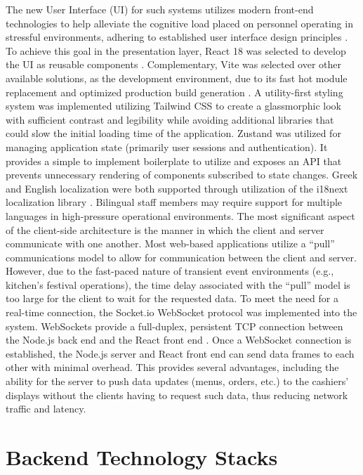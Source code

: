 The new User Interface (UI) for such systems utilizes modern front-end technologies to help alleviate the cognitive load placed on personnel operating in stressful environments, adhering to established user interface design principles \cite{galitz2007}. To achieve this goal in the presentation layer, React 18 was selected to develop the UI as reusable components \cite{react2024docs}. Complementary, Vite was selected over other available solutions, as the development environment, due to its fast hot module replacement and optimized production build generation \cite{vite2024docs}. A utility-first styling system was implemented utilizing Tailwind CSS \cite{tailwind} to create a glassmorphic look with sufficient contrast and legibility while avoiding additional libraries that could slow the initial loading time of the application. Zustand \cite{zustand} was utilized for managing application state (primarily user sessions and authentication). It provides a simple to implement boilerplate to utilize and exposes an API that prevents unnecessary rendering of components subscribed to state changes. Greek and English localization were both supported through utilization of the i18next localization library \cite{i18next2024}. Bilingual staff members may require support for multiple languages in high-pressure operational environments. The most significant aspect of the client-side architecture is the manner in which the client and server communicate with one another. Most web-based applications utilize a ``pull'' communications model to allow for communication between the client and server. However, due to the fast-paced nature of transient event environments (e.g., kitchen's festival operations), the time delay associated with the ``pull'' model is too large for the client to wait for the requested data. To meet the need for a real-time connection, the Socket.io WebSocket protocol was implemented into the system. WebSockets provide a full-duplex, persistent TCP connection between the Node.js back end and the React front end \cite{fette2011websocket}. Once a WebSocket connection is established, the Node.js server and React front end can send data frames to each other with minimal overhead. This provides several advantages, including the ability for the server to push data updates (menus, orders, etc.) to the cashiers' displays without the clients having to request such data, thus reducing network traffic and latency.

\section{Backend Technology Stacks}

